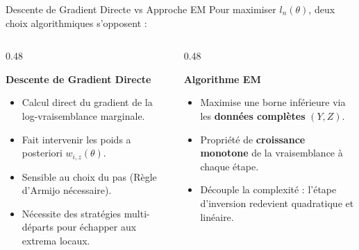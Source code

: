 \begin{frame}{Descente de Gradient Directe vs Approche EM}
    Pour maximiser $l_n(\theta)$, deux choix algorithmiques s'opposent :
    
    \vspace{0.4cm}
    \begin{columns}[t]
        \begin{column}{0.48\textwidth}
            \begin{block}{\textbf{Descente de Gradient Directe}}
                \small
                \begin{itemize}
                    \item Calcul direct du gradient de la log-vraisemblance marginale.
                    \item Fait intervenir les poids a posteriori $w_{i,z}(\theta)$.
                    \item Sensible au choix du pas (Règle d'Armijo nécessaire).
                    \item \alert{Nécessite des stratégies multi-départs} pour échapper aux extrema locaux.
                \end{itemize}
            \end{block}
        \end{column}
        
        \begin{column}{0.48\textwidth}
            \begin{block}{\textbf{Algorithme EM}}
                \small
                \begin{itemize}
                    \item Maximise une borne inférieure via les \textbf{données complètes} $(Y, Z)$.
                    \item Propriété de \textbf{croissance monotone} de la vraisemblance à chaque étape.
                    \item Découple la complexité : l'étape d'inversion redevient quadratique et linéaire.
                \end{itemize}
            \end{block}
        \end{column}
    \end{columns}
\end{frame}